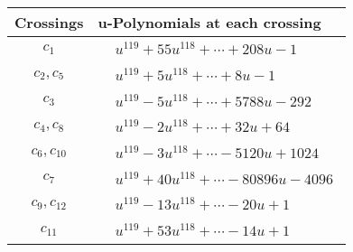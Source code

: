\documentclass[1p]{elsarticle_modified}
\theoremstyle{definition}
\begin{document}
\begin{tabular}{m{50pt}|m{274pt}}
Crossings & \hspace{64pt}u-Polynomials at each crossing \\
\hline $$\begin{aligned}c_{1}\end{aligned}$$&$\begin{aligned}
&u^{119}+55 u^{118}+\cdots+208 u-1
\end{aligned}$\\
\hline $$\begin{aligned}c_{2},c_{5}\end{aligned}$$&$\begin{aligned}
&u^{119}+5 u^{118}+\cdots+8 u-1
\end{aligned}$\\
\hline $$\begin{aligned}c_{3}\end{aligned}$$&$\begin{aligned}
&u^{119}-5 u^{118}+\cdots+5788 u-292
\end{aligned}$\\
\hline $$\begin{aligned}c_{4},c_{8}\end{aligned}$$&$\begin{aligned}
&u^{119}-2 u^{118}+\cdots+32 u+64
\end{aligned}$\\
\hline $$\begin{aligned}c_{6},c_{10}\end{aligned}$$&$\begin{aligned}
&u^{119}-3 u^{118}+\cdots-5120 u+1024
\end{aligned}$\\
\hline $$\begin{aligned}c_{7}\end{aligned}$$&$\begin{aligned}
&u^{119}+40 u^{118}+\cdots-80896 u-4096
\end{aligned}$\\
\hline $$\begin{aligned}c_{9},c_{12}\end{aligned}$$&$\begin{aligned}
&u^{119}-13 u^{118}+\cdots-20 u+1
\end{aligned}$\\
\hline $$\begin{aligned}c_{11}\end{aligned}$$&$\begin{aligned}
&u^{119}+53 u^{118}+\cdots-14 u+1
\end{aligned}$\\
\hline
\end{tabular}\\~\\
\end{document}
